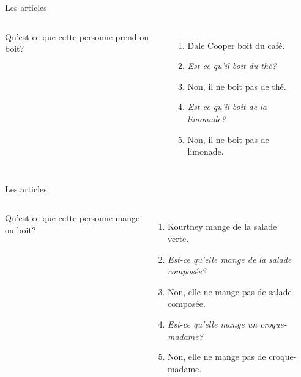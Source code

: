 \begin{frame}{Les articles}
  \begin{columns}
      Qu'est-ce que cette personne prend ou boit?
      \begin{enumerate}
        \item<2-> Dale Cooper boit du café.
        \item<2-> \emph{Est-ce qu'il boit du thé?}
        \item<3-> Non, il ne boit pas de thé.
        \item<3-> \emph{Est-ce qu'il boit de la limonade?}
        \item<4-> Non, il ne boit pas de limonade.
      \end{enumerate}
      \begin{minipage}[c][0.6\textwidth]{\linewidth}
        \begin{center}
        \end{center}
      \end{minipage}
  \end{columns}
\end{frame}

\begin{frame}{Les articles}
  \begin{columns}
      Qu'est-ce que cette personne mange ou boit?
      \begin{enumerate}
        \item<2-> Kourtney mange de la salade verte.
        \item<2-> \emph{Est-ce qu'elle mange de la salade composée?}
        \item<3-> Non, elle ne mange pas de salade composée.
        \item<3-> \emph{Est-ce qu'elle mange un croque-madame?}
        \item<4-> Non, elle ne mange pas de croque-madame.
      \end{enumerate}
      \begin{minipage}[c][0.6\textwidth]{\linewidth}
        \begin{center}
        \end{center}
      \end{minipage}
  \end{columns}
\end{frame}

